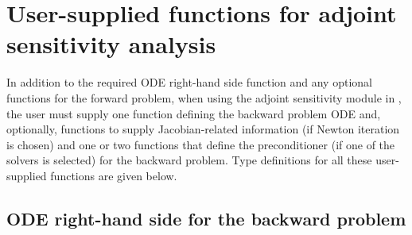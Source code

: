 \section{User-supplied functions for adjoint sensitivity analysis}
\label{ss:user_fct_adj}

In addition to the required ODE right-hand side function and any optional functions
for the forward problem, when using the adjoint sensitivity module in {\cvodes},
the user must supply one function defining the backward problem ODE and, optionally,
functions to supply Jacobian-related information (if Newton iteration is chosen) and
one or two functions that define the preconditioner (if one of the {\cvspils} solvers is
selected) for the backward problem.
Type definitions for all these user-supplied functions are given below.

\subsection{ODE right-hand side for the backward problem}

